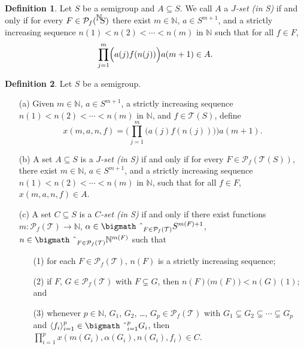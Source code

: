 \documentclass[12pt]{article}
\theoremstyle{plain}
\theoremstyle{definition}
\newtheorem*{defn}{Definition}
\newcommand{\la}{\langle}
\newcommand{\ra}{\rangle}
\newcommand{\bbN}{\mathbb{N}}
\newcommand{\calT}{\mathcal{T}}
\newcommand{\Pf}{\mathcal{P}_f}
\newcommand{\setfunc}[2]{\hbox{${}^{\hbox{$#1$}}\hskip -3 pt #2$}}
\newcommand{\bigtimes}{\hbox{\bigmath \char'2}}
\begin{document}
\begin{defn}
  Let $S$ be a semigroup and $A \subseteq S$.
  We call $A$ a \textsl{$J$-set (in S)} if and only if for every $F
  \in \Pf(\setfunc{\bbN}{S})$ there exist $m \in \bbN$, $a \in
  S^{m+1}$, and a strictly increasing sequence $n(1) < n(2) < \cdots <
  n(m)$ in $\bbN$ such that for all $f \in F$,
  \[
    \prod_{j=1}^m \Bigr( a(j) f(n(j)) \Bigl) a(m+1) \in A.
  \]
\end{defn}

\begin{defn}
  Let $S$ be a semigroup.
  \begin{itemize}
    \item[(a)] Given $m \in \bbN$, $a \in S^{m+1}$, a strictly
      increasing sequence $n(1) < n(2) < \cdots < n(m)$ in $\bbN$, and
      $f \in \calT(S)$, define
      \[
        x(m, a, n, f) = \biggl( \prod_{j=1}^m \bigl( a(j) f(n(j))
        \bigr) \biggr) a(m+1).
      \]
      
    \item[(b)] A set $A \subseteq S$ is a \textsl{$J$-set (in S)} if
      and only if for every $F \in \Pf(\calT(S))$, there exist $m \in
      \bbN$, $a \in S^{m+1}$, and a strictly increasing sequence $n(1)
      < n(2) < \cdots < n(m)$ in $\bbN$, such that for all $f \in F$,
      $x(m, a, n, f) \in A$. 

    \item[(c)] A set $C \subseteq S$ is a \textsl{$C$-set (in S)} if
      and only if there exist functions $m \colon \Pf(\calT) \to
      \bbN$, $\alpha \in \bigtimes_{F \in \Pf(\calT)} S^{m(F) + 1}$,
      $n \in \bigtimes_{F \in \Pf(\calT)} \bbN^{m(F)}$ such that 
      \begin{itemize}
        \item[(1)] for each $F \in \Pf(\calT)$, $n(F)$ is a strictly
          increasing sequence;
        
        \item[(2)] if $F$, $G \in \Pf(\calT)$ with $F \subsetneq G$,
          then $n(F)\bigl(m(F)\bigr) < n(G)(1)$; and

        \item[(3)] whenever $p \in \bbN$, $G_1$, $G_2$, \ldots, $G_p
          \in \Pf(\calT)$ with $G_1 \subsetneq G_2 \subsetneq \cdots
          \subsetneq G_p$ and $\la f_i \ra_{i=1}^p \in
          \bigtimes_{i=1}^p G_i$, then $\prod_{i=1}^p x(m(G_i),
          \alpha(G_i), n(G_i), f_i) \in C$. 
      \end{itemize}
  \end{itemize}
\end{defn}
\end{document}
